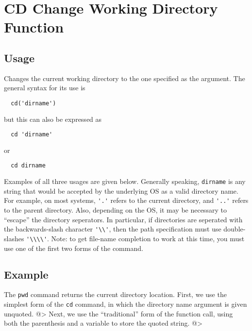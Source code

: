 \section{CD Change Working Directory Function}

\subsection{Usage}

Changes the current working directory to the one specified as the argument.  The general syntax for its use is
\begin{verbatim}
  cd('dirname')
\end{verbatim}
but this can also be expressed as
\begin{verbatim}
  cd 'dirname'
\end{verbatim}
or 
\begin{verbatim}
  cd dirname
\end{verbatim}
Examples of all three usages are given below.
Generally speaking, \verb|dirname| is any string that would be accepted 
by the underlying OS as a valid directory name.  For example, on most 
systems, \verb|'.'| refers to the current directory, and \verb|'..'| refers 
to the parent directory.  Also, depending on the OS, it may be necessary 
to ``escape'' the directory seperators.  In particular, if directories 
are seperated with the backwards-slash character \verb|'\\'|, then the 
path specification must use double-slashes \verb|'\\\\'|. Note: to get 
file-name completion to work at this time, you must use one of the 
first two forms of the command.

\subsection{Example}

The \verb|pwd| command returns the current directory location.  First, 
we use the simplest form of the \verb|cd| command, in which the directory 
name argument is given unquoted.
@>
Next, we use the ``traditional'' form of the function call, using 
both the parenthesis and a variable to store the quoted string.
@>
